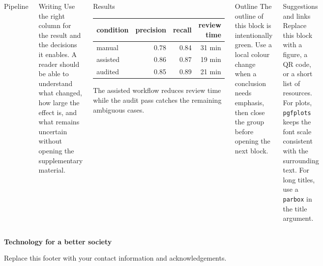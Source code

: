 \documentclass[final]{beamer}
\begin{document}
\begin{frame}[t]
\begin{columns}
\begin{block}{Pipeline}
\end{block}
\column{0.47\paperwidth}
\begin{block}{Writing}
  Use the right column for the result and the decisions it enables. A reader
  should be able to understand what changed, how large the effect is, and
  what remains uncertain without opening the supplementary material.
\end{block}
\begin{block}{Results}
  \centering\begin{tabular}{lrrr}\toprule
  condition & precision & recall & review time\\\midrule
  manual & 0.78 & 0.84 & 31 min\\
  assisted & 0.86 & 0.87 & 19 min\\
  audited & 0.85 & 0.89 & 21 min\\\bottomrule
  \end{tabular}
  \vspace{0.5em}\raggedright\small The assisted workflow reduces review time
  while the audit pass catches the remaining ambiguous cases.
\end{block}
\begin{block}{Outline}
  The outline of this block is intentionally green. Use a local colour change
  when a conclusion needs emphasis, then close the group before opening the
  next block.
\end{block}
\begin{block}{Suggestions and links}
  Replace this block with a figure, a QR code, or a short list of resources.
  For plots, \texttt{pgfplots} keeps the font scale consistent with the surrounding
  text. For long titles, use a \texttt{\\parbox} in the title argument.
\end{block}
\end{columns}
\vfill
\begin{center}\Large\color{sintefgreen}\bfseries Technology for a better society\par\normalsize\color{sintefdark}Replace this footer with your contact information and acknowledgements.\end{center}
\end{frame}
\end{document}
